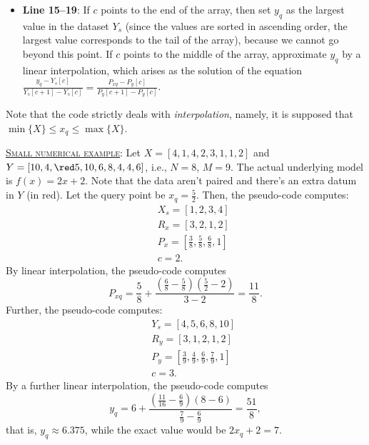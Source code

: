 \documentclass[10pt,final]{siamltex}
\begin{document}
{{\begin{itemize}
\item \textbf{Line 15--19}: If $c$ points to the end of the array, then set $y_q$ as the largest value in the dataset $Y_s$ (since the values are sorted in ascending order, the largest value corresponds to the tail of the array), because we cannot go beyond this point. If $c$ points to the middle of the array, approximate $y_q$ by a linear interpolation, which arises as the solution of the equation $\tfrac{y_q-Y_s[c]}{Y_s[c+1]-Y_s[c]}=\tfrac{P_{xq}-P_y[c]}{P_y[c+1]-P_y[c]}$.
\end{itemize}

Note that the code strictly deals with \emph{interpolation}, namely, it is supposed that $\min\{X\}\leq x_q \leq \max\{X\}$.

\begin{tcolorbox}[colback=gray!30,%
                  colframe=black,%
                  width=\dimexpr\linewidth-2\fboxrule\relax,
                  arc=3mm, auto outer arc, 
                  breakable
                 ]
\underline{\textsc{Small numerical example}}: Let $X=[4,1,4,2,3,1,1,2]$ and $Y=[10,     4,    {\red 5},10,     6,     8,     4,     4,     6]$, i.e., $N=8$, $M=9$. The actual underlying model is $f(x)=2x+2$. Note that the data aren't paired and there's an extra datum in $Y$ (in red). Let the query point be $x_q=\tfrac{5}{2}$. Then, the pseudo-code computes:
%
\begin{eqnarray*}
&& X_s = [1,     2,     3,     4]\\
&& R_x = [3,     2,     1,     2]\\
&& P_x = [\tfrac{3}{8}, \tfrac{5}{8}, \tfrac{6}{8}, 1]\\
&& c = 2.
\end{eqnarray*}
%
By linear interpolation, the pseudo-code computes 
%
\begin{equation*}
P_{xq}=\frac{5}{8}+\frac{\left(\tfrac{6}{8}-\tfrac{5}{8}\right)\left(\tfrac{5}{2}-2\right)}{3-2}=\frac{11}{8}.
\end{equation*}
%
Further, the pseudo-code computes:
%
\begin{eqnarray*}
&& Y_s = [4,     5,     6,     8,    10]\\
&& R_y = [3,     1,     2,     1,     2]\\
&& P_y = [\tfrac{3}{9}, \tfrac{4}{9}, \tfrac{6}{9}, \tfrac{7}{9}, 1]\\
&& c = 3.
\end{eqnarray*}
%
By a further linear interpolation, the pseudo-code computes 
%
\begin{equation*}
y_q = 6 + \frac{\left(\tfrac{11}{16}-\tfrac{6}{9}\right)\left(8-6\right)}{\tfrac{7}{9}-\tfrac{6}{9}}=\frac{51}{8},
\end{equation*}
%
that is, $y_q\approx 6.375$, while the exact value would be $2x_q+2=7$.


\end{tcolorbox}}}
\end{document}
